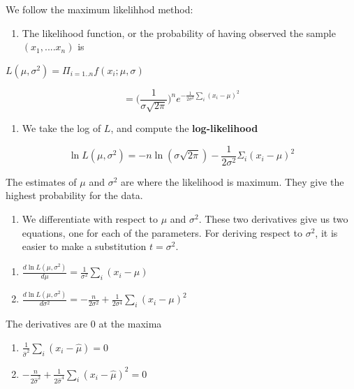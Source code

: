 \documentclass[
]{book}
\providecommand{\tightlist}{%
  \setlength{\itemsep}{0pt}\setlength{\parskip}{0pt}}
\begin{document}
We follow the maximum likelihhod method:

\begin{enumerate}
\def\labelenumi{\arabic{enumi}.}
\tightlist
\item
  The likelihood function, or the probability of having observed the sample \((x_1, ....x_n)\) is
\end{enumerate}

\(L(\mu, \sigma^2)=\Pi_{i=1..n} f(x_i;\mu,\sigma)\)

\[=\big( \frac{1}{\sigma \sqrt{2 \pi}}\big)^n e^{-\frac{1}{2\sigma^2} \sum_i(x_i-\mu)^2}\]

\begin{enumerate}
\def\labelenumi{\arabic{enumi}.}
\setcounter{enumi}{1}
\tightlist
\item
  We take the log of \(L\), and compute the \textbf{log-likelihood}
\end{enumerate}

\[\ln L(\mu, \sigma^2)=-n \ln(\sigma \sqrt{2 \pi})-\frac{1}{2\sigma^2} \Sigma_i(x_i-\mu)^2\]

The estimates of \(\mu\) and \(\sigma^2\) are where the likelihood is maximum. They give the highest probability for the data.

\begin{enumerate}
\def\labelenumi{\arabic{enumi}.}
\setcounter{enumi}{2}
\tightlist
\item
  We differentiate with respect to \(\mu\) and \(\sigma^2\). These two derivatives give us two equations, one for each of the parameters. For deriving respect to \(\sigma^2\), it is easier to make a substitution \(t=\sigma^2\).
\end{enumerate}

\begin{enumerate}
\def\labelenumi{\alph{enumi})}
\item
  \(\frac{d \ln L(\mu, \sigma^2)}{d\mu}=\frac{1}{\sigma^2} \sum_i(x_i-\mu)\)
\item
  \(\frac{d \ln L(\mu, \sigma^2)}{d\sigma^2}=-\frac{n}{2 \sigma^2}+\frac{1}{2\sigma^4} \sum_i(x_i-\mu)^2\)
\end{enumerate}

The derivatives are \(0\) at the maxima

\begin{enumerate}
\def\labelenumi{\alph{enumi})}
\tightlist
\item
  \(\frac{1}{\hat{\sigma}^2} \sum_i(x_i-\hat{\mu})=0\)
\item
  \(-\frac{n}{2 \hat{\sigma}^2}+\frac{1}{2\hat{\sigma}^4} \sum_i(x_i-\hat{\mu})^2=0\)
\end{enumerate}
\end{document}
